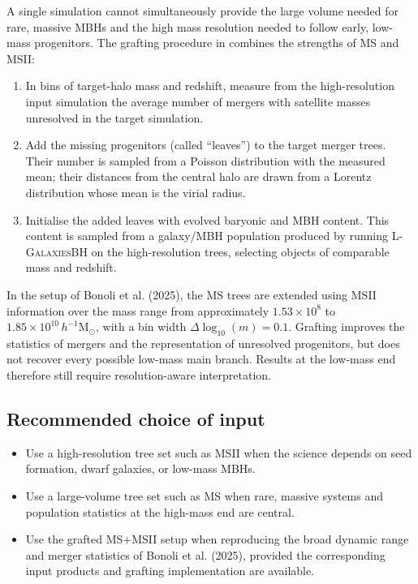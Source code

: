 \documentclass[11pt,a4paper]{article}
\newcommand{\Msun}{\mathrm{M}_{\odot}}
\newcommand{\Lgalbh}{\textsc{L-GalaxiesBH}}
\begin{document}
A single simulation cannot simultaneously provide the large volume needed for rare, massive MBHs and the high mass resolution needed to follow early, low-mass progenitors. The grafting procedure in \citet{Bonoli2025} combines the strengths of MS and MSII:
\begin{enumerate}
  \item In bins of target-halo mass and redshift, measure from the high-resolution input simulation the average number of mergers with satellite masses unresolved in the target simulation.
  \item Add the missing progenitors (called ``leaves'') to the target merger trees. Their number is sampled from a Poisson distribution with the measured mean; their distances from the central halo are drawn from a Lorentz distribution whose mean is the virial radius.
  \item Initialise the added leaves with evolved baryonic and MBH content. This content is sampled from a galaxy/MBH population produced by running \Lgalbh{} on the high-resolution trees, selecting objects of comparable mass and redshift.
\end{enumerate}

In the setup of Bonoli et al. (2025), the MS trees are extended using MSII information over the mass range from approximately $1.53\times10^8$ to $1.85\times10^{10}\,h^{-1}\Msun$, with a bin width $\Delta\log_{10}(m)=0.1$. Grafting improves the statistics of mergers and the representation of unresolved progenitors, but does not recover every possible low-mass main branch. Results at the low-mass end therefore still require resolution-aware interpretation.

\subsection{Recommended choice of input}
\begin{itemize}
  \item Use a high-resolution tree set such as MSII when the science depends on seed formation, dwarf galaxies, or low-mass MBHs.
  \item Use a large-volume tree set such as MS when rare, massive systems and population statistics at the high-mass end are central.
  \item Use the grafted MS+MSII setup when reproducing the broad dynamic range and merger statistics of Bonoli et al. (2025), provided the corresponding input products and grafting implementation are available.
\end{itemize}
\end{document}
